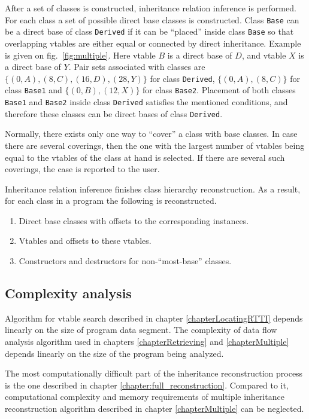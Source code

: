 \documentclass[10pt, conference]{IEEEtran}
\newcommand{\compact}{}
\begin{document}
After a set of classes is constructed, inheritance relation inference
is performed.
For each class a set of possible direct base classes is constructed.
Class \lstinline{Base} can be a direct base of class \lstinline{Derived}
if it can be ``placed'' inside class \lstinline{Base} so that overlapping
vtables are either equal or connected by direct inheritance. Example
is given on fig.~\ref{fig:multiple}. Here vtable $B$ is a direct
base of $D$, and vtable $X$ is a direct base of $Y$. Pair sets associated
with classes are $\{(0, A), (8, C), (16, D), (28, Y)\}$ for
class \lstinline{Derived}, $\{(0, A), (8, C)\}$ for class \lstinline{Base1}
and $\{(0, B), (12, X)\}$ for class \lstinline{Base2}. Placement of
both classes \lstinline{Base1} and \lstinline{Base2} inside
class \lstinline{Derived} satisfies the mentioned conditions,
and therefore these classes can be direct bases of class \lstinline{Derived}.

Normally, there exists only one way to ``cover'' a class with
base classes. In case there are several coverings, then the one with
the largest number of vtables being equal to the vtables of the
class at hand is selected. If there are several such coverings,
the case is reported to the user. %

Inheritance relation inference finishes class hierarchy reconstruction.
As a result, for each class in a program the following is reconstructed.
\begin{enumerate}\compact
\item Direct base classes with offsets to the corresponding instances.
\item Vtables and offsets to these vtables.
\item Constructors and destructors for non-``most-base'' classes.
\end{enumerate}



\quad

\subsection{Complexity analysis}

Algorithm for vtable search described in chapter \ref{chapterLocatingRTTI} depends
linearly on the size of program data segment.
The complexity of data flow analysis algorithm used in chapters \ref{chapterRetrieving}
and \ref{chapterMultiple} depends linearly on the size of the program being analyzed.

The most computationally difficult part of the inheritance reconstruction
process is the one described in chapter \ref{chapter:full_reconstruction}.
Compared to it, computational complexity and memory requirements of
multiple inheritance reconstruction algorithm described in
chapter \ref{chapterMultiple} can be neglected.
\end{document}
